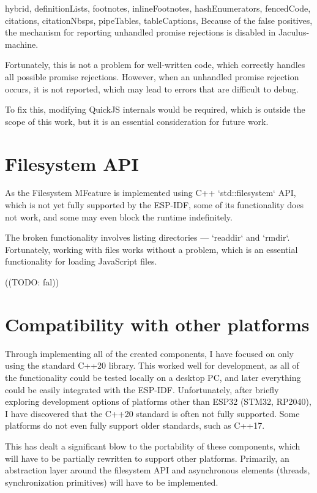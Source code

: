 \begin{markdown*}{%
  hybrid,
  definitionLists,
  footnotes,
  inlineFootnotes,
  hashEnumerators,
  fencedCode,
  citations,
  citationNbsps,
  pipeTables,
  tableCaptions,
}
Because of the false positives, the mechanism for reporting unhandled promise rejections is disabled in Jaculus-machine.

Fortunately, this is not a problem for well-written code, which correctly handles all possible promise rejections. However, when an unhandled promise rejection occurs, it is not reported, which may lead to errors that are difficult to debug.

To fix this, modifying QuickJS internals would be required, which is outside the scope of this work, but it is an essential consideration for future work.


\section{Filesystem API}

As the Filesystem MFeature is implemented using C++ `std::filesystem` API, which is not yet fully supported by the ESP-IDF, some of its functionality does not work, and some may even block the runtime indefinitely.

The broken functionality involves listing directories --- `readdir` and `rmdir`. Fortunately, working with files works without a problem, which is an essential functionality for loading JavaScript files.

((TODO: fal))

\section{Compatibility with other platforms}

Through implementing all of the created components, I have focused on only using the standard C++20 library. This worked well for development, as all of the functionality could be tested locally on a desktop PC, and later everything could be easily integrated with the ESP-IDF. Unfortunately, after briefly exploring development options of platforms other than ESP32 (STM32, RP2040), I have discovered that the C++20 standard is often not fully supported. Some platforms do not even fully support older standards, such as C++17.

This has dealt a significant blow to the portability of these components, which will have to be partially rewritten to support other platforms. Primarily, an abstraction layer around the filesystem API and asynchronous elements (threads, synchronization primitives) will have to be implemented.


\end{markdown*}
